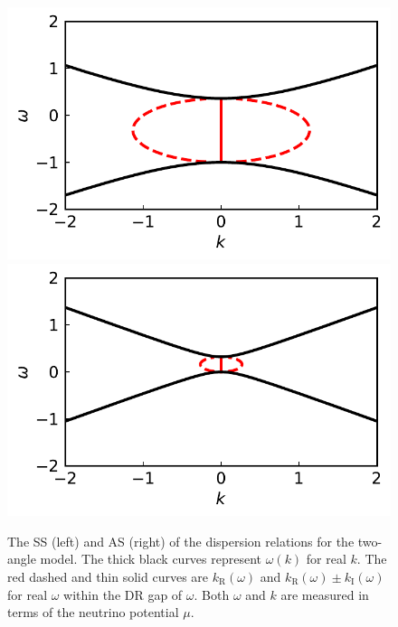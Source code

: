 \begin{figure}[!htb]
  \includegraphics[width=\linewidth]{chapters/assets/dr/spectDBWC1DRDBMZAPltBlob}
\endminipage\hfill
{}
  \includegraphics[width=\linewidth]{chapters/assets/dr/spectDBWC1DRDBMAAPltBlob}
\endminipage\hfill
\caption{The SS (left) and AS (right) of the dispersion relations for the two-angle model. The thick black curves represent $\omega(k)$ for real $k$. The red dashed and thin solid curves are $k_{\mathrm R}(\omega)$ and $k_{\mathrm R}(\omega) \pm k_{\mathrm I}(\omega)$ for real $\omega$ within the DR gap of $\omega$. Both $\omega$ and $k$ are measured in terms of the neutrino potential $\mu$.}
\label{fig-dr-db}
\end{figure}





